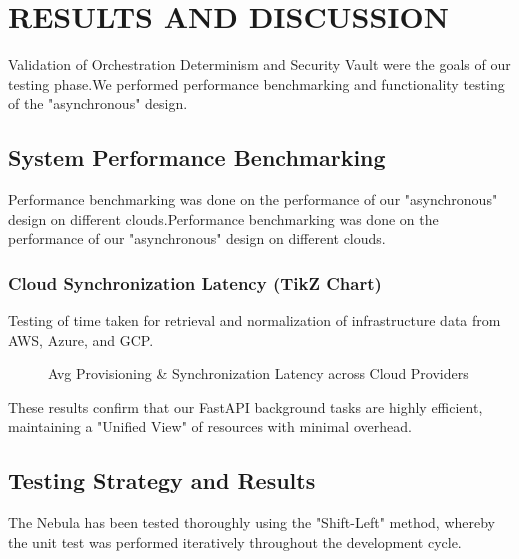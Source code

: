 \chapter{RESULTS AND DISCUSSION}


Validation of Orchestration Determinism and Security Vault were the goals of our testing phase.We performed performance benchmarking and functionality testing of the "asynchronous" design.

\section{System Performance Benchmarking}
Performance benchmarking was done on the performance of our "asynchronous" design on different clouds.Performance benchmarking was done on the performance of our "asynchronous" design on different clouds.

\subsection{Cloud Synchronization Latency (TikZ Chart)}
Testing of time taken for retrieval and normalization of infrastructure data from AWS, Azure, and GCP.

\begin{figure}[h]
\centering
{}
\caption{Avg Provisioning & Synchronization Latency across Cloud Providers}
\label{fig:performance_chart}
\end{figure}

These results confirm that our FastAPI background tasks are highly efficient, maintaining a "Unified View" of resources with minimal overhead.

\section{Testing Strategy and Results}
The Nebula has been tested thoroughly using the "Shift-Left" method, whereby the unit test was performed iteratively throughout the development cycle.

